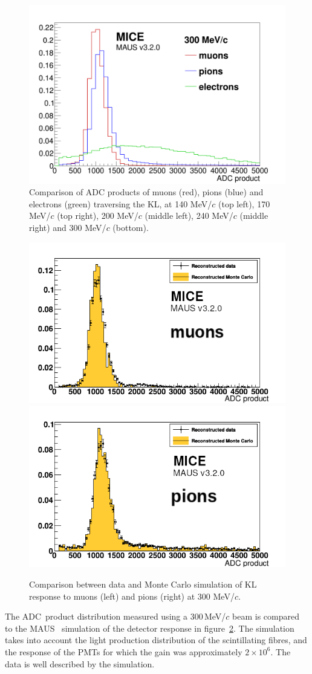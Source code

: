 \begin{figure}
\begin{center}
    \includegraphics[width=0.49\columnwidth]{./04-KL/Figures/mu_vs_pi_vs_e_300MeV.png}
  \end{center}
  \caption{
    Comparison of ADC products of muons (red), pions (blue) and electrons (green) traversing the KL, at 140
    MeV/$c$ (top left), 170 MeV/$c$ (top right), 200 MeV/$c$ (middle
    left), 240 MeV/$c$ (middle right) and 300 MeV/$c$ (bottom).
  }
  \label{fig:KL4}
\end{figure}
\begin{figure}
  \begin{center}
    \includegraphics[width=0.49\columnwidth]{./04-KL/Figures/muon_mc_vs_data_edited.png}
    \includegraphics[width=0.49\columnwidth]{./04-KL/Figures/pion_mc_vs_data_edited.png}
  \end{center}
  \caption{
    Comparison between data and Monte Carlo simulation of KL response
    to muons (left) and pions (right) at 300 MeV/$c$.
  } 
  \label{fig:KL_mc_vs_data}
\end{figure}

The ADC~product distribution measured using a 300\,MeV/$c$ beam is
compared to the MAUS~\cite{MAUS} simulation of the detector response in
figure~\ref{fig:KL_mc_vs_data}.
The simulation takes into account the light production distribution of the
scintillating fibres, and the response of the PMTs for which the gain was
approximately $2 \times 10^6$. 
The data is well described by the simulation.
